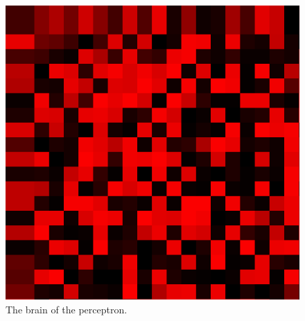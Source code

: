 \documentclass[12pt]{article}
\begin{document}
\begin{figure}[H]
  \centering
  \includegraphics{brain.png}
  \caption{The brain of the perceptron.}
\end{figure}
\end{document}
